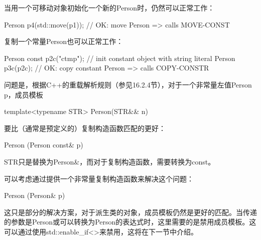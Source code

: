 当用一个可移动对象初始化一个新的Person时，仍然可以正常工作：

\begin{cpp}
Person p4(std::move(p1)); // OK: move Person => calls MOVE-CONST
\end{cpp}

复制一个常量Person也可以正常工作：

\begin{cpp}
Person const p2c("ctmp"); // init constant object with string literal
Person p3c(p2c); // OK: copy constant Person => calls COPY-CONSTR
\end{cpp}

问题是，根据C++的重载解析规则（参见16.2.4节），对于一个非常量左值Person p，成员模板

\begin{cpp}
template<typename STR>
Person(STR&& n)
\end{cpp}

要比（通常是预定义的）复制构造函数匹配的更好：

\begin{cpp}
Person (Person const& p)
\end{cpp}

STR只是替换为Person\&，而对于复制构造函数，需要转换为const。

可以考虑通过提供一个非常量复制构造函数来解决这个问题：

\begin{cpp}
Person (Person& p)
\end{cpp}

这只是部分的解决方案，对于派生类的对象，成员模板仍然是更好的匹配。当传递的参数是Person或可以转换为Person的表达式时，这里需要的是禁用成员模板。这可以通过使用std::enable\_if<>来禁用，这将在下一节中介绍。
































